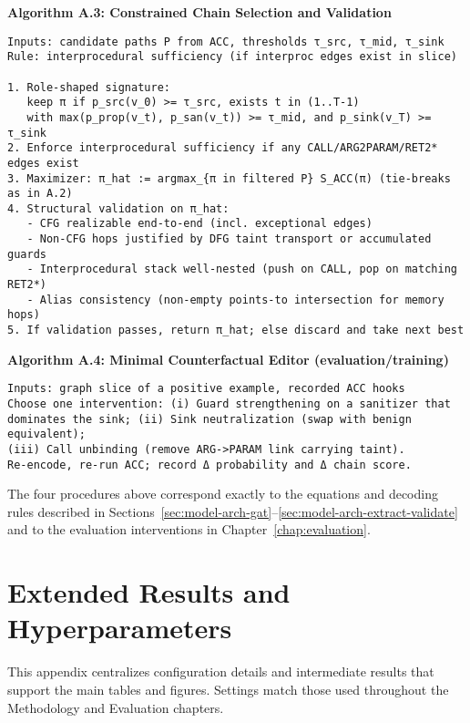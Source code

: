 \documentclass{buthesis}
\begin{document}
\begin{appendices}
\noindent\textbf{Algorithm A.3: Constrained Chain Selection and Validation}
\begin{lstlisting}
Inputs: candidate paths P from ACC, thresholds τ_src, τ_mid, τ_sink
Rule: interprocedural sufficiency (if interproc edges exist in slice)

1. Role-shaped signature:
   keep π if p_src(v_0) >= τ_src, exists t in (1..T-1)
   with max(p_prop(v_t), p_san(v_t)) >= τ_mid, and p_sink(v_T) >= τ_sink
2. Enforce interprocedural sufficiency if any CALL/ARG2PARAM/RET2* edges exist
3. Maximizer: π_hat := argmax_{π in filtered P} S_ACC(π) (tie-breaks as in A.2)
4. Structural validation on π_hat:
   - CFG realizable end-to-end (incl. exceptional edges)
   - Non-CFG hops justified by DFG taint transport or accumulated guards
   - Interprocedural stack well-nested (push on CALL, pop on matching RET2*)
   - Alias consistency (non-empty points-to intersection for memory hops)
5. If validation passes, return π_hat; else discard and take next best
\end{lstlisting}

\noindent\textbf{Algorithm A.4: Minimal Counterfactual Editor (evaluation/training)}
\begin{lstlisting}
Inputs: graph slice of a positive example, recorded ACC hooks
Choose one intervention: (i) Guard strengthening on a sanitizer that
dominates the sink; (ii) Sink neutralization (swap with benign equivalent);
(iii) Call unbinding (remove ARG->PARAM link carrying taint).
Re-encode, re-run ACC; record Δ probability and Δ chain score.
\end{lstlisting}

\bigskip
The four procedures above correspond exactly to the equations and decoding rules
described in Sections~\ref{sec:model-arch-gat}–\ref{sec:model-arch-extract-validate} and to the
evaluation interventions in Chapter~\ref{chap:evaluation}.




\chapter{Extended Results and Hyperparameters}

This appendix centralizes configuration details and intermediate results that
support the main tables and figures. Settings match those used throughout the
Methodology and Evaluation chapters.


\end{appendices}
\end{document}
